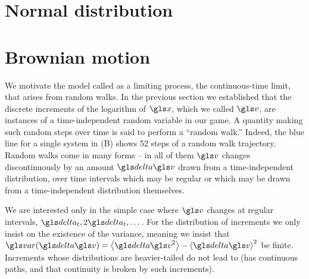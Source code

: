 %
%

\section{Normal distribution}

\section{Brownian motion}
We motivate the model called \BM as a limiting process, the continuous-time limit, that arises from random walks.
In the previous section we established that the discrete increments of the logarithm of 
$\x$, which we called $\gv$, are instances of a time-independent random variable in our game. A quantity 
making such random steps over time is said to perform a ``random walk.'' 
Indeed, the blue line for a single system in  (B) shows 52 steps of a random walk trajectory.
Random walks come in many forms -- in all of them $\gv$ changes discontinuously by an amount 
$\d \gv$ drawn from a time-independent distribution, over time intervals which may be regular or which may be drawn from a time-independent distribution themselves.

We are interested only in the simple case where $\gv$ changes at regular intervals, $\dt, 2\dt, \dots$. For 
the distribution of increments we only insist on the existence of the variance, meaning we insist that 
$\var(\d \gv)=\ave{\d \gv^2}-\ave{\d \gv}^2$ be finite. Increments whose distributions are heavier-tailed do 
not lead to \BM (\BM has continuous paths, and that continuity 
is broken by such increments).

